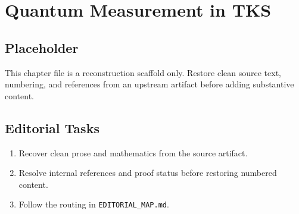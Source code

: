 \chapter{Quantum Measurement in TKS}
\label{chap:quantum-measurement-in-tks}

\section*{Placeholder}
This chapter file is a reconstruction scaffold only. Restore clean source text, numbering, and references from an upstream artifact before adding substantive content.

\section*{Editorial Tasks}
\begin{enumerate}
\item Recover clean prose and mathematics from the source artifact.
\item Resolve internal references and proof status before restoring numbered content.
\item Follow the routing in \texttt{EDITORIAL\_MAP.md}.
\end{enumerate}
